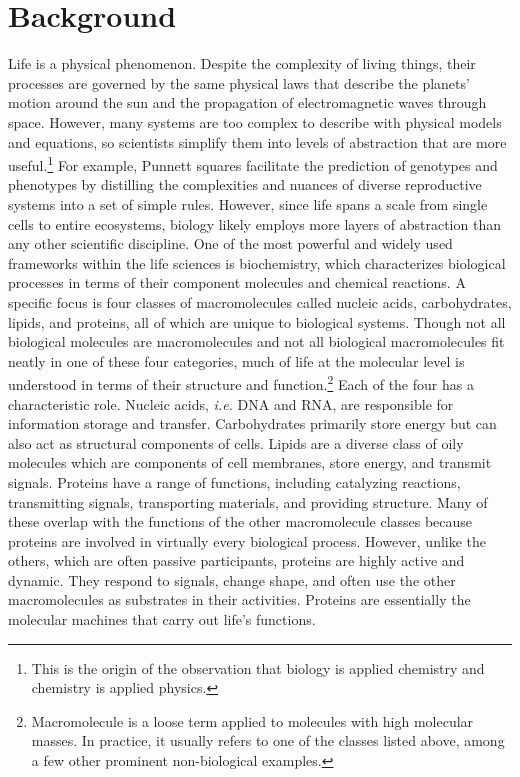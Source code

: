 \section{Background}
Life is a physical phenomenon. Despite the complexity of living things, their processes are governed by the same physical laws that describe the planets' motion around the sun and the propagation of electromagnetic waves through space. However, many systems are too complex to describe with physical models and equations, so scientists simplify them into levels of abstraction that are more useful.\footnote{This is the origin of the observation that biology is applied chemistry and chemistry is applied physics.} For example, Punnett squares facilitate the prediction of genotypes and phenotypes by distilling the complexities and nuances of diverse reproductive systems into a set of simple rules. However, since life spans a scale from single cells to entire ecosystems, biology likely employs more layers of abstraction than any other scientific discipline. One of the most powerful and widely used frameworks within the life sciences is biochemistry, which characterizes biological processes in terms of their component molecules and chemical reactions. A specific focus is four classes of macromolecules called nucleic acids, carbohydrates, lipids, and proteins, all of which are unique to biological systems. Though not all biological molecules are macromolecules and not all biological macromolecules fit neatly in one of these four categories, much of life at the molecular level is understood in terms of their structure and function.\footnote{Macromolecule is a loose term applied to molecules with high molecular masses. In practice, it usually refers to one of the classes listed above, among a few other prominent non-biological examples.} Each of the four has a characteristic role. Nucleic acids, \textit{i.e.} DNA and RNA, are responsible for information storage and transfer. Carbohydrates primarily store energy but can also act as structural components of cells. Lipids are a diverse class of oily molecules which are components of cell membranes, store energy, and transmit signals. Proteins have a range of functions, including catalyzing reactions, transmitting signals, transporting materials, and providing structure. Many of these overlap with the functions of the other macromolecule classes because proteins are involved in virtually every biological process. However, unlike the others, which are often passive participants, proteins are highly active and dynamic. They respond to signals, change shape, and often use the other macromolecules as substrates in their activities. Proteins are essentially the molecular machines that carry out life's functions.

